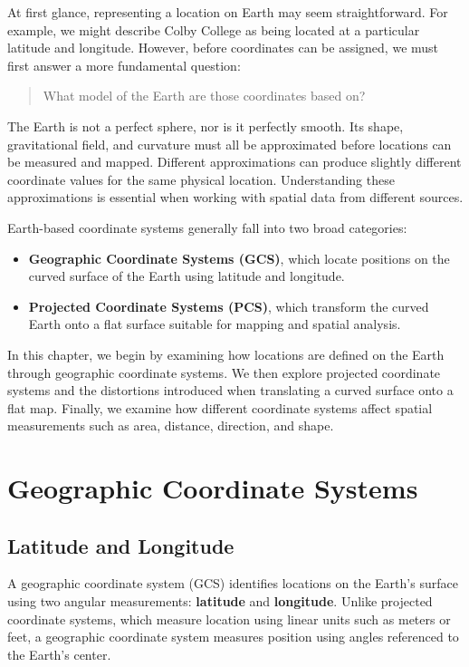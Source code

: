 \documentclass[
  letterpaper,
]{book}
\providecommand{\tightlist}{%
  \setlength{\itemsep}{0pt}\setlength{\parskip}{0pt}}
\begin{document}
At first glance, representing a location on Earth may seem
straightforward. For example, we might describe Colby College as being
located at a particular latitude and longitude. However, before
coordinates can be assigned, we must first answer a more fundamental
question:

\begin{quote}
What model of the Earth are those coordinates based on?
\end{quote}

The Earth is not a perfect sphere, nor is it perfectly smooth. Its
shape, gravitational field, and curvature must all be approximated
before locations can be measured and mapped. Different approximations
can produce slightly different coordinate values for the same physical
location. Understanding these approximations is essential when working
with spatial data from different sources.

Earth-based coordinate systems generally fall into two broad categories:

\begin{itemize}
\tightlist
\item
  \textbf{Geographic Coordinate Systems (GCS)}, which locate positions
  on the curved surface of the Earth using latitude and longitude.
\item
  \textbf{Projected Coordinate Systems (PCS)}, which transform the
  curved Earth onto a flat surface suitable for mapping and spatial
  analysis.
\end{itemize}

In this chapter, we begin by examining how locations are defined on the
Earth through geographic coordinate systems. We then explore projected
coordinate systems and the distortions introduced when translating a
curved surface onto a flat map. Finally, we examine how different
coordinate systems affect spatial measurements such as area, distance,
direction, and shape.

\section{Geographic Coordinate
Systems}\label{geographic-coordinate-systems}

\subsection{Latitude and Longitude}\label{latitude-and-longitude}

A geographic coordinate system (GCS) identifies locations on the Earth's
surface using two angular measurements: \textbf{latitude} and
\textbf{longitude}. Unlike projected coordinate systems, which measure
location using linear units such as meters or feet, a geographic
coordinate system measures position using angles referenced to the
Earth's center.
\end{document}
